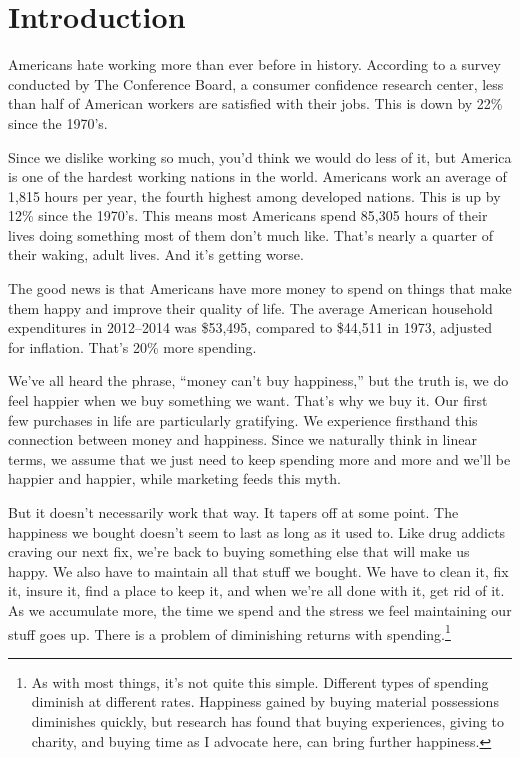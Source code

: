 \chapter*{Introduction}
Americans hate working more than ever before in history. According to a survey conducted by The Conference Board, a consumer confidence research center, less than half of American workers are satisfied with their jobs. This is down by 22\% since the 1970's.\cite{livescience}

Since we dislike working so much, you'd think we would do less of it, but America is one of the hardest working nations in the world. Americans work an average of 1,815 hours per year, the fourth highest among developed nations. This is up by 12\% since the 1970's.\cite{anderson-cnn} This means most Americans spend 85,305 hours of their lives doing something most of them don't much like. That's nearly a quarter of their waking, adult lives. And it's getting worse.

The good news is that Americans have more money to spend on things that make them happy and improve their quality of life. The average American household expenditures in 2012--2014 was \$53,495\cite{bls-spending-2014}, compared to \$44,511 in 1973\cite{bls-spending-1973}, adjusted for inflation. That's 20\% more spending.

We've all heard the phrase, ``money can't buy happiness,'' but the truth is, we do feel happier when we buy something we want. That's why we buy it. Our first few purchases in life are particularly gratifying. We experience firsthand this connection between money and happiness. Since we naturally think in linear terms, we assume that we just need to keep spending more and more and we'll be happier and happier, while marketing feeds this myth.

But it doesn't necessarily work that way. It tapers off at some point. The happiness we bought doesn't seem to last as long as it used to. Like drug addicts craving our next fix, we're back to buying something else that will make us happy. We also have to maintain all that stuff we bought. We have to clean it, fix it, insure it, find a place to keep it, and when we're all done with it, get rid of it. As we accumulate more, the time we spend and the stress we feel maintaining our stuff goes up. There is a problem of diminishing returns with spending.\footnote{As with most things, it's not quite this simple. Different types of spending diminish at different rates. Happiness gained by buying material possessions diminishes quickly, but research has found that buying experiences, giving to charity, and buying time as I advocate here, can bring further happiness.\cite{wsj-can-money-buy-happiness}}

